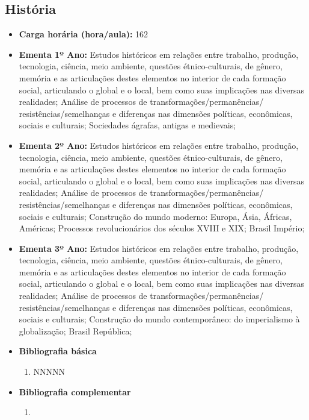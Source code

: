 \documentclass[11pt,fleqn]{book} %
\begin{document}
\subsection{História}\label{disc:historia}
\begin{itemize}
	\item \textbf{Carga horária (hora/aula):} 162
	\item \textbf{Ementa 1º Ano:} 
	Estudos históricos em relações entre trabalho, produção, tecnologia, ciência, meio ambiente, questões étnico-culturais, de gênero, memória e as articulações destes elementos no interior de cada formação social, articulando o global e o local, bem como suas implicações nas diversas realidades; 
	Análise de processos de transformações/permanências/ resistências/semelhanças e diferenças nas dimensões políticas, econômicas, sociais e culturais;
	Sociedades ágrafas, antigas e medievais;
	\item \textbf{Ementa 2º Ano:} 
	Estudos históricos em relações entre trabalho, produção, tecnologia, ciência, meio ambiente, questões étnico-culturais, de gênero, memória e as articulações destes elementos no interior de cada formação social, articulando o global e o local, bem como suas implicações nas diversas realidades; 
    Análise de processos de transformações/permanências/ resistências/semelhanças e diferenças nas dimensões políticas, econômicas, sociais e culturais;		
	Construção do mundo moderno: Europa, Ásia, Áfricas, Américas;
	Processos revolucionários dos séculos XVIII e XIX; 
	Brasil Império;
	\item \textbf{Ementa 3º Ano:} 
	Estudos históricos em relações entre trabalho, produção, tecnologia, ciência, meio ambiente, questões étnico-culturais, de gênero, memória e as articulações destes elementos no interior de cada formação social, articulando o global e o local, bem como suas implicações nas diversas realidades; 
	Análise de processos de transformações/permanências/ resistências/semelhanças e diferenças nas dimensões políticas, econômicas, sociais e culturais;			
	Construção do mundo contemporâneo: do imperialismo à globalização; 
	Brasil República;
	\item \textbf{Bibliografia básica}
	\begin{enumerate}
		\item NNNNN
	\end{enumerate}
	\item \textbf{Bibliografia complementar}
	\begin{enumerate}
		\item 
	\end{enumerate}	
\end{itemize}
\end{document}
